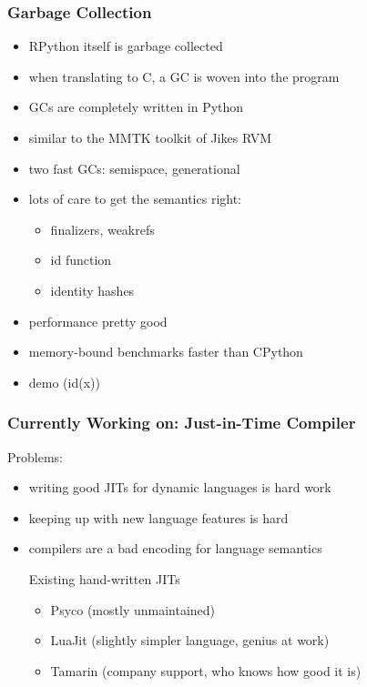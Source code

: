 \documentclass[utf8x]{beamer}
\begin{document}
\begin{frame}
  \frametitle{Garbage Collection}
  \begin{itemize}
  \item RPython itself is garbage collected
  \item when translating to C, a GC is woven into the program
  \item GCs are completely written in Python
  \item similar to the MMTK toolkit of Jikes RVM
  \item two fast GCs: semispace, generational
  \item lots of care to get the semantics right:
    \begin{itemize}
    \item finalizers, weakrefs
    \item id function
    \item identity hashes
    \end{itemize}
  \item performance pretty good
  \item memory-bound benchmarks faster than CPython
  \item demo (id(x))
  \end{itemize}
\end{frame}


\begin{frame}
  \frametitle{Currently Working on: Just-in-Time Compiler}
  Problems:
  \begin{itemize}
  \item writing good JITs for dynamic languages is hard work
  \item keeping up with new language features is hard
  \item compilers are a bad encoding for language semantics
  \pause
  \begin{block}{
    Existing hand-written JITs}
    \begin{itemize}
    \item Psyco (mostly unmaintained)
    \item LuaJit (slightly simpler language, genius at work)
    \item Tamarin (company support, who knows how good it is)
    \end{itemize}
  \end{block}
  \end{itemize}
  \pause
\end{frame}
\end{document}
